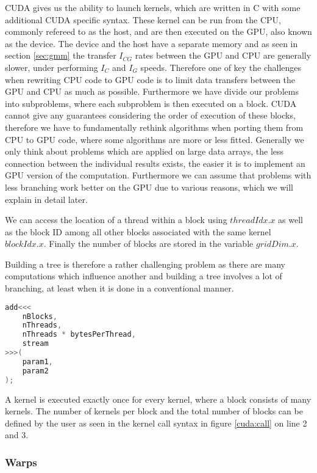 \documentclass[]{article}
\begin{document}
CUDA gives us the ability to launch kernels, which are written in C with some additional CUDA specific syntax. These kernel can be run from the CPU, commonly refereed to as the host, and are then executed on the GPU, also known as the device. The device and the host have a separate memory and as seen in section \ref{sec:gmm} the transfer $I_{CG}$ rates between the GPU and CPU are generally slower, under performing $I_{C}$ and $I_G$ speeds. Therefore one of key the challenges when rewriting CPU code to GPU code is to limit data transfers between the GPU and CPU as much as possible. Furthermore we have divide our problems into subproblems, where each subproblem is then executed on a block. CUDA cannot give any guarantees considering the order of execution of these blocks, therefore we have to fundamentally rethink algorithms when porting them from CPU to GPU code, where some algorithms are more or less fitted. Generally we only think about problems which are applied on large data arrays, the less connection between the individual results exists, the easier it is to implement an GPU version of the computation. Furthermore we can assume that problems with less branching work better on the GPU due to various reasons, which we will explain in detail later. 

We can access the location of a thread within a block using $threadIdx.x$ as well as the block ID among all other blocks associated with the same kernel $blockIdx.x$. Finally the number of blocks are stored in the variable $gridDim.x$. 

Building a tree is therefore a rather challenging problem as there are many computations which influence another and building a tree involves a lot of branching, at least when it is done in a conventional manner.


\begin{lstlisting}[language=c++, caption=Calling a CUDA Kernel, label=cuda:call]
add<<<
	nBlocks,
	nThreads,
	nThreads * bytesPerThread,
	stream
>>>(
	param1,
	param2
);
\end{lstlisting}


A kernel is executed exactly once for every kernel, where a block consists of many kernels. The number of kernels per block and the total number of blocks can be defined by the user as seen in the kernel call syntax in figure \ref{cuda:call} on line 2 and 3. 


\subsubsection{Warps}
\end{document}
